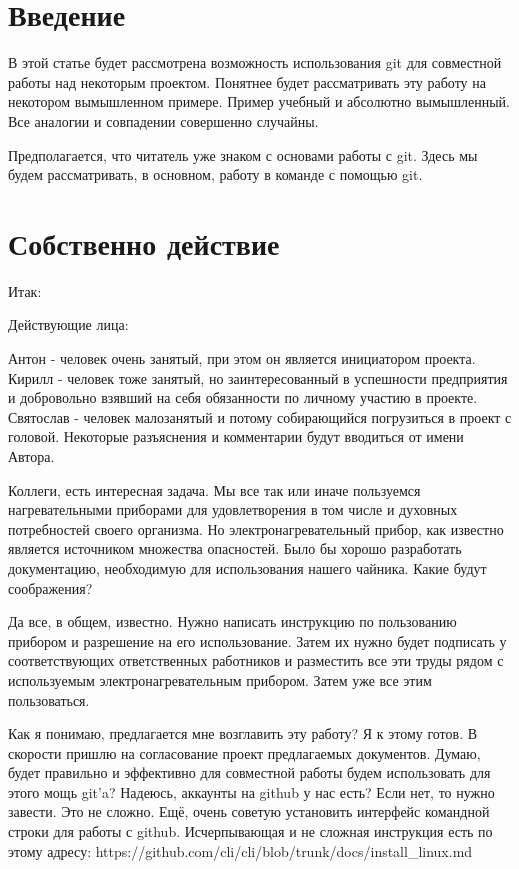 \documentclass[14pt,a4paper]{article}
\begin{document}
\section{Введение}
В этой статье будет рассмотрена возможность использования git для совместной работы над 
некоторым проектом. Понятнее будет рассматривать эту работу на некотором вымышленном примере. 
Пример учебный и абсолютно вымышленный. Все аналогии и совпадении совершенно случайны.

Предполагается, что читатель уже знаком с основами работы с git. Здесь мы будем рассматривать,
в основном, работу в команде с помощью git.

\section{Собственно действие}
Итак:

Действующие лица:

Антон - человек очень занятый, при этом он является инициатором проекта.
Кирилл - человек тоже занятый, но заинтересованный в успешности предприятия и добровольно
взявший на себя обязанности по личному участию в проекте.
Святослав - человек малозанятый и потому собирающийся погрузиться в проект с головой.
Некоторые разъяснения и комментарии будут вводиться от имени Автора.


 Коллеги, есть интересная задача. Мы все так или иначе пользуемся нагревательными приборами
для удовлетворения в том числе и духовных потребностей своего организма. Но электронагревательный 
прибор, как известно является источником множества опасностей. Было бы хорошо разработать
документацию, необходимую для использования нашего чайника. Какие будут соображения?

 Да все, в общем, известно. Нужно написать инструкцию по пользованию прибором и разрешение
на его использование. 
Затем их нужно будет подписать у соответствующих ответственных работников и разместить все эти труды
рядом с используемым электронагревательным прибором. Затем уже все этим пользоваться. 

 Как я понимаю, предлагается мне возглавить эту работу? Я к этому готов. В скорости
пришлю на согласование проект предлагаемых документов. Думаю, будет правильно и эффективно
для совместной работы будем использовать для этого мощь git'a? Надеюсь, аккаунты на github у нас есть?
Если нет, то нужно завести. Это не сложно. Ещё, очень советую установить интерфейс командной
строки для работы с github. Исчерпывающая и не сложная инструкция есть по этому адресу:
https://github.com/cli/cli/blob/trunk/docs/install\_linux.md
\end{document}
